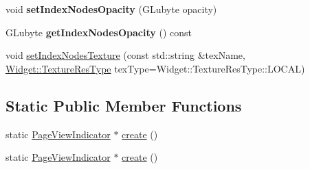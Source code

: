 \begin{DoxyCompactItemize}
void {\bfseries set\+Index\+Nodes\+Opacity} (G\+Lubyte opacity)
\item 
\mbox{\label{classui_1_1PageViewIndicator_a03f681cad0da0e26f23d0d4efb507d13}} 
G\+Lubyte {\bfseries get\+Index\+Nodes\+Opacity} () const
\item 
void \hyperlink{classui_1_1PageViewIndicator_a02f6ac9b071c66c829cb448416fa59e2}{set\+Index\+Nodes\+Texture} (const std\+::string \&tex\+Name, \hyperlink{classui_1_1Widget_a040a65ec5ad3b11119b7e16b98bd9af0}{Widget\+::\+Texture\+Res\+Type} tex\+Type=Widget\+::\+Texture\+Res\+Type\+::\+L\+O\+C\+AL)
\end{DoxyCompactItemize}
\subsection*{Static Public Member Functions}
\begin{DoxyCompactItemize}
\item 
static \hyperlink{classui_1_1PageViewIndicator}{Page\+View\+Indicator} $\ast$ \hyperlink{classui_1_1PageViewIndicator_a7a9abf8796b02efe36810e70e19591d6}{create} ()
\item 
static \hyperlink{classui_1_1PageViewIndicator}{Page\+View\+Indicator} $\ast$ \hyperlink{classui_1_1PageViewIndicator_ae9227f8bd42b0a26c9dc9abfcf71aa07}{create} ()
\end{DoxyCompactItemize}
